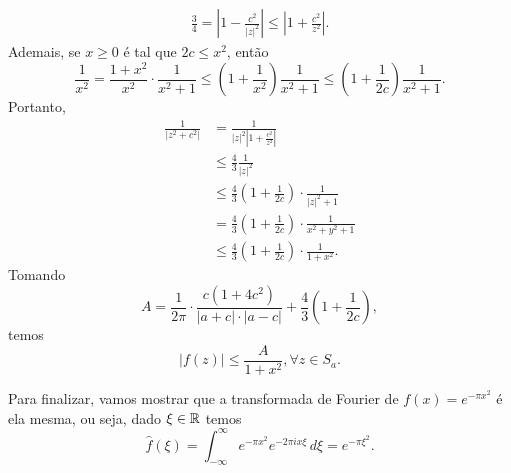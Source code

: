 \begin{exemplo}
            \begin{align*}
                \frac{3}{4} = \left|1 - \frac{c^2}{|z|^2}\right| \leq \left|1 + \frac{c^2}{z^2}\right|.
            \end{align*}
            Ademais, se $x\geq 0$ é tal que $2c \leq x^2$, então
            \begin{equation*}
                \frac{1}{x^2} = \frac{1+x^2}{x^2}\cdot\frac{1}{x^2+1}
                              \leq \left( 1+\frac{1}{x^2} \right)\frac{1}{x^2+1}
                              \leq \left( 1+\frac{1}{2c} \right)\frac{1}{x^2+1}.
            \end{equation*} 
            Portanto,
            \begin{align*}
                \frac{1}{|z^2+c^2|} &= \frac{1}{|z|^2\left|1+\frac{c^2}{z^2}\right|} \\
                                    &\leq \frac{4}{3}\frac{1}{|z|^2} \\
                                    &\leq \frac{4}{3}\left(1+\frac{1}{2c}\right)\cdot\frac{1}{|z|^2+1} \\
                                    &= \frac{4}{3}\left(1+\frac{1}{2c}\right)\cdot\frac{1}{x^2+y^2+1} \\
                                    &\leq \frac{4}{3}\left(1+\frac{1}{2c}\right)\cdot\frac{1}{1+x^2}.
            \end{align*}
            Tomando
            \begin{equation*}
                A =\frac{1}{2\pi}\cdot\frac{c(1+4c^2)}{|a+c|\cdot|a-c|}
                +\frac{4}{3}\left(1+\frac{1}{2c}\right),
            \end{equation*}
            temos
            \begin{equation*}
                |f(z)| \leq \frac{A}{1+ x^2}, \forall z\in S_a.
            \end{equation*}
        \end{exemplo}
        Para finalizar, vamos mostrar que a transformada de Fourier de $f(x) = e^{-\pi x^2}$ é
        ela mesma, ou seja, dado $\xi\in\mathbb{R}$ temos
        \begin{equation*}
            \widehat{f}(\xi) = \int_{-\infty}^{\infty} e^{-\pi x^2}e^{-2\pi ix\xi} \, d\xi 
                             = e^{-\pi \xi^2}.
        \end{equation*}
